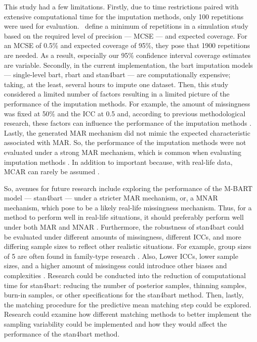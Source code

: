 \documentclass[3p,12pt,a4paper]{elsarticle}
\begin{document}
This study had a few limitations. Firstly, due to time restrictions paired with extensive computational time for the imputation methods, only 100 repetitions were used for evaluation.~\citet{morris2019} define a minimum of repetitions in a simulation study based on the required level of precision --- MCSE --- and expected coverage. For an MCSE of 0.5\% and expected coverage of 95\%, they pose that 1900 repetitions are needed. As a result, especially our 95\% confidence interval coverage estimates are variable. Secondly, in the current implementation, the bart imputation models --- single-level bart, rbart and stan4bart --- are computationally expensive; taking, at the least, several hours to impute one dataset. Then, this study considered a limited number of factors resulting in a limited picture of the performance of the imputation methods. For example, the amount of missingness was fixed at 50\% and the ICC at 0.5 and, according to previous methodological research, these factors can influence the performance of the imputation methods \citep{enders2018,enders2018a,enders2020,mistler2017,akkayahocagil2023,grund2016,grund2018a,grund2018,ludtke2017,grund2021}. Lastly, the generated MAR mechanism did not mimic the expected characteristic associated with MAR. So, the performance of the imputation methods were not evaluated under a strong MAR mechanism, which is common when evaluating imputation methods \citep{buurenFlexibleImputationMissing2018,enders2018a,peeters2015,austin2021,carpenter2013,little2002,grund2018,ludtke2017,grund2021,schouten2021}. In addition to important because, with real-life data, MCAR can rarely be assumed \citep{oberman2023,buurenFlexibleImputationMissing2018,kang2013,little2002}.

So, avenues for future research include exploring the performance of the M-BART model --- stan4bart --- under a stricter MAR mechanism, or, a MNAR mechanism, which \citet{oberman2023} pose to be a likely real-life missingness mechanism. Thus, for a method to perform well in real-life situations, it should preferably perform well under both MAR and MNAR \citep{oberman2023}. Furthermore, the robustness of stan4bart could be evaluated under different amounts of missingness, different ICCs, and more differing sample sizes to reflect other realistic situations. For example, group sizes of 5 are often found in family-type research \citep{maas2005}. Also, Lower ICCs, lower sample sizes, and a higher amount of missingess could introduce other biases and complexities \citep{enders2018,enders2018a,enders2020,mistler2017,akkayahocagil2023,grund2016,grund2018a,grund2018,ludtke2017,grund2021}. Research could be conducted into the reduction of computational time for stan4bart: reducing the number of posterior samples, thinning samples, burn-in samples, or other specifications for the stan4bart method. Then, lastly, the matching procedure for the predictive mean matching step could be explored. Research could examine how different matching methods to better implement the sampling variability \citep{buurenFlexibleImputationMissing2018} could be implemented and how they would affect the performance of the stan4bart method.
\end{document}
